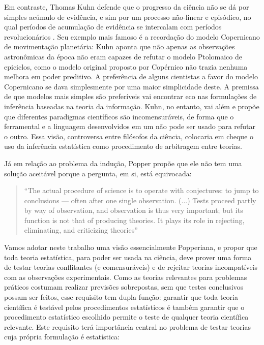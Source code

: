 Em contraste, Thomas Kuhn defende que o progresso da ciência não se dá por
simples acúmulo de evidência, e sim por um processo não-linear e episódico, no qual períodos de acumulação de evidência se
intercalam com períodos revolucionários \citep{Kuhn62}. 
Seu exemplo mais famoso é a recordação do modelo Copernicano de movimentação planetária:
Kuhn aponta que não apenas as observações astronômicas da época não eram capazes de refutar o modelo Ptolomaico de epiciclos,
como o modelo original proposto por Copérnico não trazia nenhuma melhora em poder preditivo. A preferência de alguns cientistas
a favor do modelo Copernicano se dava simplesmente por uma maior simplicidade deste. A premissa de que modelos mais simples
são preferíveis vai encontrar eco nas formulações de inferência baseadas na teoria da informação. Kuhn, no entanto, vai além
e propõe que diferentes paradigmas científicos são incomensuráveis, de forma que o ferramental e a linguagem desenvolvidos
em um não pode ser usado para refutar o outro. Essa visão, controversa entre filósofos da ciência, colocaria em cheque o uso da
inferência estatística como procedimento de arbitragem entre teorias.

Já em relação ao problema da indução, Popper propõe que ele não tem uma solução aceitável porque a pergunta, em si, está
equivocada:

\begin{quote}
``The actual procedure of science is to operate with conjectures: to jump to conclusions — often after one single observation.
(...) Tests proceed partly by way of observation, and observation is thus very important; but its function is not that of 
producing theories. It plays its role in rejecting, eliminating, and criticizing theories'' \citep{Popper63}
\end{quote}

Vamos adotar neste trabalho uma visão essencialmente Popperiana, e propor que toda teoria estatística, para poder ser
usada na ciência, deve prover uma forma de testar teorias conflitantes (e comensuráveis)
e de rejeitar teorias incompatíveis com as observações experimentais. Como as teorias relevantes para problemas práticos costumam
realizar previsões sobrepostas, %
sem que testes conclusivos possam ser feitos, esse requisito tem dupla função: garantir
que toda teoria científica é testável pelos procedimentos estatísticos é também garantir que o procedimento estatístico escolhido
permite o teste de qualquer teoria científica relevante. Este requisito terá importância central no problema de testar
teorias cuja própria formulação é estatística:

